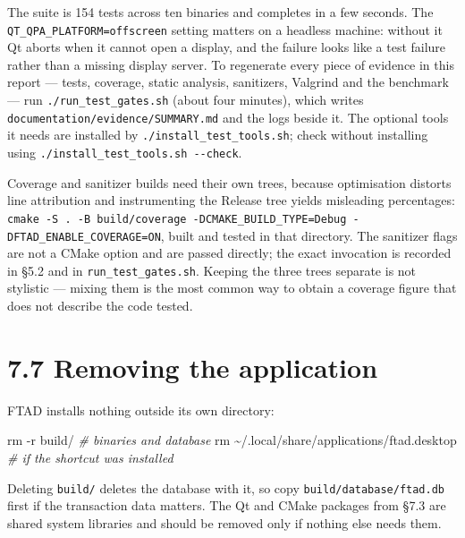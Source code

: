 \documentclass[
  12pt,
]{report}
\newenvironment{Shaded}{}{}
\newcommand{\AttributeTok}[1]{\textcolor[rgb]{0.49,0.56,0.16}{#1}}
\newcommand{\CommentTok}[1]{\textcolor[rgb]{0.38,0.63,0.69}{\textit{#1}}}
\newcommand{\FunctionTok}[1]{\textcolor[rgb]{0.02,0.16,0.49}{#1}}
\newcommand{\NormalTok}[1]{#1}
\begin{document}
The suite is 154 tests across ten binaries and completes in a few
seconds. The \texttt{QT\_QPA\_PLATFORM=offscreen} setting matters on a
headless machine: without it Qt aborts when it cannot open a display,
and the failure looks like a test failure rather than a missing display
server. To regenerate every piece of evidence in this report --- tests,
coverage, static analysis, sanitizers, Valgrind and the benchmark ---
run \texttt{./\allowbreak{}run\_test\_gates.sh} (about four minutes), which writes
\texttt{documentation/\allowbreak{}evidence/\allowbreak{}SUMMARY.md} and the logs beside it. The
optional tools it needs are installed by
\texttt{./\allowbreak{}install\_test\_tools.sh}; check without installing using
\texttt{./\allowbreak{}install\_test\_tools.sh\ -\/\allowbreak{}-check}.

Coverage and sanitizer builds need their own trees, because optimisation
distorts line attribution and instrumenting the Release tree yields
misleading percentages:
\texttt{cmake\ -S\ .\ -B\ build/\allowbreak{}coverage\ -DCMAKE\_BUILD\_TYPE=Debug\ -DFTAD\_ENABLE\_COVERAGE=ON},
built and tested in that directory. The sanitizer flags are not a CMake
option and are passed directly; the exact invocation is recorded in §5.2
and in \texttt{run\_test\_gates.sh}. Keeping the three trees separate is
not stylistic --- mixing them is the most common way to obtain a
coverage figure that does not describe the code tested.

\section{7.7 Removing the application}\label{removing-the-application}

FTAD installs nothing outside its own directory:

\begin{Shaded}
\begin{Highlighting}[]
\FunctionTok{rm} \AttributeTok{{-}r}\NormalTok{ build/                                   }\CommentTok{\# binaries and database}
\FunctionTok{rm}\NormalTok{ \textasciitilde{}/.local/share/applications/ftad.desktop    }\CommentTok{\# if the shortcut was installed}
\end{Highlighting}
\end{Shaded}

Deleting \texttt{build/\allowbreak{}} deletes the database with it, so copy
\texttt{build/\allowbreak{}database/\allowbreak{}ftad.db} first if the transaction data matters.
The Qt and CMake packages from §7.3 are shared system libraries and
should be removed only if nothing else needs them.
\end{document}
